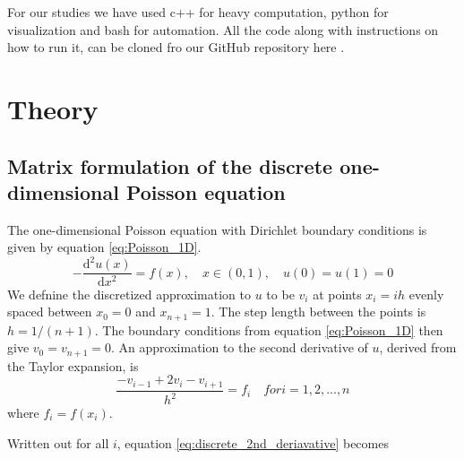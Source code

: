 \documentclass[reprint, english,notitlepage]{revtex4-1}  %
\begin{document}
For our studies we have used c++ for heavy computation, python for visualization and bash for automation. All the code along with instructions on how to run it, can be cloned fro our GitHub repository here \citep{github}.

\section{Theory}

\subsection{Matrix formulation of the discrete one-dimensional Poisson equation}
The one-dimensional Poisson equation with Dirichlet boundary conditions is given by equation \ref{eq:Poisson_1D}.
\begin{equation}
  \label{eq:Poisson_1D}
  - \frac{\mathrm d^2 u(x)}{\mathrm d x^2} = f(x), \quad x \in (0, 1), \quad u(0) = u(1) = 0
\end{equation}
We defnine the discretized approximation to $u$ to be $v_i$ at points $x_i = i h$ evenly spaced between $x_0 = 0$ and $x_{n+1} = 1$. The step length between the points is $h = 1/(n + 1)$. The boundary conditions from equation \ref{eq:Poisson_1D} then give $v_0 = v_{n+1} = 0$. An approximation to the second derivative of $u$, derived from the Taylor expansion, is
\begin{equation}
  \label{eq:discrete_2nd_deriavative}
  \frac{-v_{i-1} + 2 v_i - v_{i+1}}{h^2} = f_i \quad for i = 1, 2, ..., n
\end{equation}
where $f_i = f(x_i)$.

Written out for all $i$, equation \ref{eq:discrete_2nd_deriavative} becomes
\end{document}
